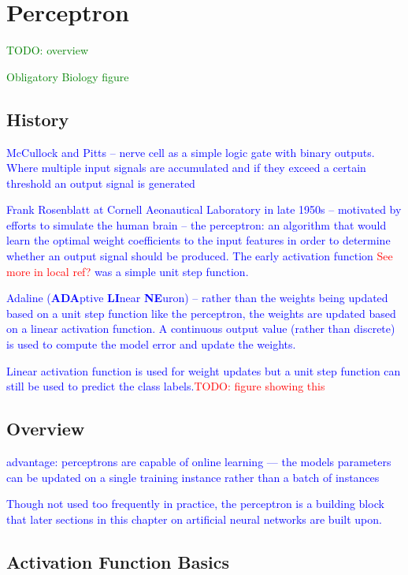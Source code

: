 \section{Perceptron}

\textcolor{green}{TODO: overview}

\textcolor{green}{Obligatory Biology figure}

\subsection{History}

\textcolor{blue}{McCullock and Pitts -- nerve cell as a simple logic gate with binary outputs.  Where multiple input signals are accumulated and if they exceed a certain threshold an output signal is generated}

\textcolor{blue}{Frank Rosenblatt at Cornell Aeonautical Laboratory in late 1950s -- motivated by efforts to simulate the human brain -- the perceptron: an algorithm that would learn the optimal weight coefficients to the input features in order to determine whether an output signal should be produced. The early activation function \textcolor{red}{See more in local ref?} was a simple unit step function.}

\textcolor{blue}{Adaline (\textbf{ADA}ptive \textbf{LI}near \textbf{NE}uron) -- rather than the weights being updated based on a unit step function like the perceptron, the weights are updated based on a linear activation function. A continuous output value (rather than discrete) is used to compute the model error and update the weights.}

\textcolor{blue}{Linear activation function is used for weight updates but a unit step function can still be used to predict the class labels.\textcolor{red}{TODO: figure showing this}}

\subsection{Overview}

\textcolor{blue}{advantage: perceptrons are capable of online learning --- the models parameters can be updated on a single training instance rather than a batch of instances}

\textcolor{blue}{Though not used too frequently in practice, the perceptron is a building block that later sections in this chapter on artificial neural networks are built upon.}

\subsection{Activation Function Basics}

